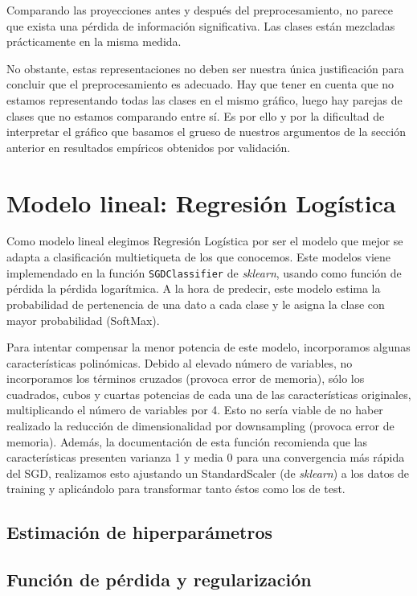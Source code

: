 \documentclass[a4]{article}
\begin{document}
Comparando las proyecciones antes y después del preprocesamiento, no
parece que exista una pérdida de información significativa. Las
clases están mezcladas prácticamente en la misma medida.

No obstante, estas representaciones no deben ser nuestra única
justificación para concluir que el preprocesamiento es adecuado. Hay
que tener en cuenta que no estamos representando todas las clases en
el mismo gráfico, luego hay parejas de clases que no estamos
comparando entre sí. Es por ello y por la dificultad de interpretar el gráfico que basamos el grueso de nuestros argumentos de la sección
anterior en resultados empíricos obtenidos por validación.

\section{Modelo lineal: Regresión Logística}

Como modelo lineal elegimos Regresión Logística por ser el modelo que
mejor se adapta a clasificación multietiqueta de los que
conocemos. Este modelos viene implemendado en la función
\texttt{SGDClassifier} de \textit{sklearn}, usando como función de
pérdida la pérdida logarítmica. A la hora de predecir, este modelo
estima la probabilidad de pertenencia de una dato a cada clase y le
asigna la clase con mayor probabilidad (SoftMax).

Para intentar compensar la menor potencia de este modelo, incorporamos
algunas características polinómicas. Debido al elevado número de
variables, no incorporamos los términos cruzados (provoca error de
memoria), sólo los cuadrados, cubos y cuartas potencias de cada una de
las características originales, multiplicando el número de variables
por 4. Esto no sería viable de no haber realizado la reducción de
dimensionalidad por downsampling (provoca error de memoria). Además,
la documentación de esta función recomienda que las características
presenten varianza 1 y media 0 para una convergencia más rápida del
SGD, realizamos esto ajustando un StandardScaler (de \textit{sklearn})
a los datos de training y aplicándolo para transformar tanto éstos
como los de test.

\subsection{Estimación de hiperparámetros}

\subsection{Función de pérdida y regularización}
\end{document}
